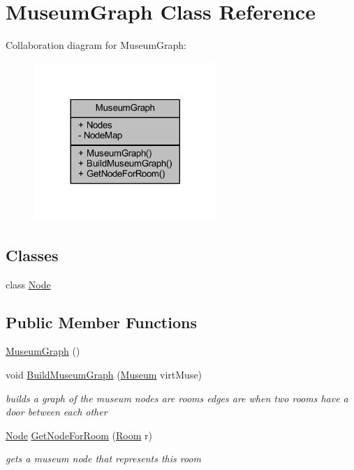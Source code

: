 \hypertarget{class_museum_graph}{}\section{Museum\+Graph Class Reference}
\label{class_museum_graph}


Collaboration diagram for Museum\+Graph\+:\nopagebreak
\begin{figure}[H]
\begin{center}
\leavevmode
\includegraphics[width=197pt]{class_museum_graph__coll__graph}
\end{center}
\end{figure}
\subsection*{Classes}
\begin{DoxyCompactItemize}
\item 
class \mbox{\hyperlink{class_museum_graph_1_1_node}{Node}}
\end{DoxyCompactItemize}
\subsection*{Public Member Functions}
\begin{DoxyCompactItemize}
\item 
\mbox{\hyperlink{class_museum_graph_a36c6cda2e0045c0d501e6c1c5dc286bf}{Museum\+Graph}} ()
\item 
void \mbox{\hyperlink{class_museum_graph_a36a26248bb9c304f8e67c60eb6d517f5}{Build\+Museum\+Graph}} (\mbox{\hyperlink{class_museum}{Museum}} virt\+Muse)
\begin{DoxyCompactList}\small\item\em builds a graph of the museum nodes are rooms edges are when two rooms have a door between each other \end{DoxyCompactList}\item 
\mbox{\hyperlink{class_museum_graph_1_1_node}{Node}} \mbox{\hyperlink{class_museum_graph_a82509a5eb8dd2020aaee17261bedb974}{Get\+Node\+For\+Room}} (\mbox{\hyperlink{class_room}{Room}} r)
\begin{DoxyCompactList}\small\item\em gets a museum node that represents this room \end{DoxyCompactList}\end{DoxyCompactItemize}
